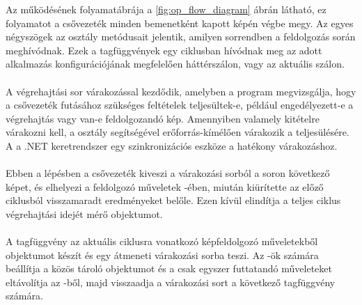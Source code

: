 Az  működésének folyamatábrája a \ref{fig:op_flow_diagram} ábrán látható, ez folyamatot a csővezeték minden bemenetként kapott képén végbe megy. Az egyes négyszögek az osztály metódusait jelentik, amilyen sorrendben a feldolgozás során meghívódnak. Ezek a tagfüggvények egy ciklusban hívódnak meg az adott alkalmazás konfigurációjának megfelelően háttérszálon, vagy az aktuális szálon.

\paragraph{} A végrehajtási sor várakozással kezdődik, amelyben a program megvizsgálja, hogy a csővezeték futásához szükséges feltételek teljesültek-e, például engedélyezett-e a végrehajtás vagy van-e feldolgozandó kép. Amennyiben valamely kitételre várakozni kell, a  osztály segítségével erőforrás-kímélően várakozik a teljesülésére. A  a .NET keretrendszer egy szinkronizációs eszköze a hatékony várakozáshoz.
\paragraph{} Ebben a lépésben a csővezeték kiveszi a  várakozási sorból a soron következő képet, és elhelyezi a feldolgozó műveletek -ében, miután kiürítette az előző ciklusból visszamaradt eredményeket belőle. Ezen kívül elindítja a teljes ciklus végrehajtási idejét mérő  objektumot.
\paragraph{} A tagfüggvény az aktuális ciklusra vonatkozó képfeldolgozó műveletekből  objektumot készít és egy átmeneti várakozási sorba teszi. Az -ök számára beállítja a közös tároló objektumot és a csak egyszer futtatandó műveleteket eltávolítja az -ből, majd visszaadja a várakozási sort a következő tagfüggvény számára.
